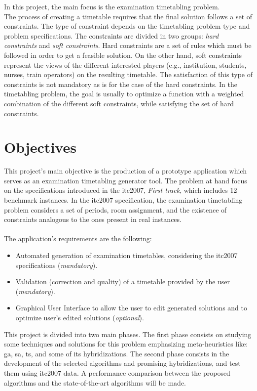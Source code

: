 In this project, the main focus is the examination timetabling problem. \\

The process of creating a timetable requires that the final solution follows a set of constraints. The type of constraint depends on the timetabling problem type and problem specifications. The constraints are divided in two groups: \textit{hard constraints} and \textit{soft constraints}. Hard constraints are a set of rules which must be followed in order to get a feasible solution. On the other hand, soft constraints represent the views of the different interested players (e.g., institution, students, nurses, train operators) on the resulting timetable. The satisfaction of this type of constraints is not mandatory as is for the case of the hard constraints. In the timetabling problem, the goal is usually to optimize a function with a weighted combination of the different soft constraints, while satisfying the set of hard constraints. 

\section{Objectives}
\label{section:Objts}

This project's main objective is the production of a prototype application which serves as an examination timetabling generator tool. The problem at hand focus on the specifications introduced in the \gls{itc2007}, \textit{First track}, which includes 12 benchmark instances. In the \gls{itc2007} specification, the examination timetabling problem considers a set of periods, room assignment, and the existence of constraints analogous to the ones present in real instances.\\
\\
The application's requirements are the following:

\begin{itemize}
	\item Automated generation of examination timetables, considering the \gls{itc2007} specifications (\textit{mandatory}).
	\item Validation (correction and quality) of a timetable provided by the user (\textit{mandatory}).
	\item Graphical User Interface to allow the user to edit generated solutions and to optimize user's edited solutions (\textit{optional}).
\end{itemize}

This project is divided into two main phases. The first phase consists on studying some techniques and solutions for this problem emphasizing meta-heuristics like: \gls{ga}, \gls{sa}, \gls{ts}, and some of its hybridizations. The second phase consists in the development of the selected algorithms and promising hybridizations, and test them using \gls{itc2007} data. A performance comparison between the proposed algorithms and the state-of-the-art algorithms will be made.

